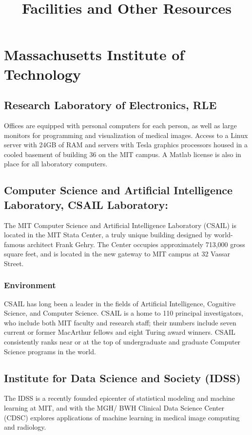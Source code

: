 \documentclass[11pt]{amsart}
\title{Facilities and Other Resources}
\author{}
\date{}
\begin{document}
\maketitle
\hypertarget{x-massachusetts-institute-of-technology}{\section*{Massachusetts Institute of Technology}}
\hypertarget{x-research-laboratory-of-electronics,-rle}{\subsection*{Research Laboratory of Electronics, RLE}}
Offices are equipped with personal computers for each person, as well as large monitors for programming and visualization of medical images. Access to a Linux server with 24GB of RAM and servers with Tesla graphics processors housed in a cooled basement of building 36 on the MIT campus. A Matlab license is also in place for all laboratory computers.


\hypertarget{x-computer-science-and-artificial-intelligence-laboratory,-csail-laboratory:}{\subsection*{Computer Science and Artificial Intelligence Laboratory, CSAIL Laboratory:}}
The MIT Computer Science and Artificial Intelligence Laboratory (CSAIL) is located in the MIT Stata Center, a truly unique building designed by world-famous architect Frank Gehry. The Center occupies approximately 713,000 gross square feet, and is located in the new gateway to MIT campus at 32 Vassar Street.


\hypertarget{x-environment}{\subsubsection*{Environment}}
CSAIL has long been a leader in the fields of Artificial Intelligence, Cognitive Science, and Computer Science. CSAIL is a home to 110 principal investigators, who include both MIT faculty and research staff; their numbers include seven current or former MacArthur fellows and eight Turing award winners. CSAIL consistently ranks near or at the top of undergraduate and graduate Computer Science programs in the world.


\hypertarget{x-institute-for-data-science-and-society-(idss)}{\subsection*{Institute for Data Science and Society (IDSS)}}
The IDSS is a recently founded epicenter of statistical modeling and machine learning at MIT, and with the MGH/ BWH Clinical Data Science Center (CDSC) explores applications of machine learning in medical
image computing and radiology.
\end{document}
